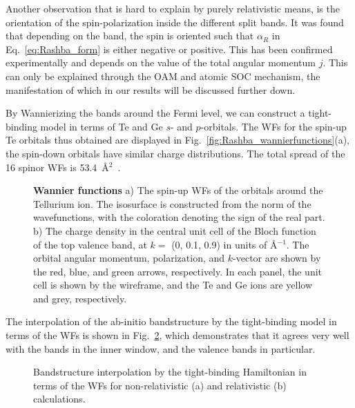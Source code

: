 Another observation that is hard to explain by purely relativistic means, is the orientation of the spin-polarization inside the different split bands.
It was found that depending on the band, the spin is oriented such that $\alpha_R$ in Eq.~\ref{eq:Rashba_form} is either negative or positive. 
This has been confirmed experimentally\cite{Krempasky2015SurfaceSemiconductor} and depends on the value of the total angular momentum $j$.
This can only be explained through the OAM and atomic SOC mechanism, the manifestation of which in our results will be discussed further down.

By Wannierizing the bands around the Fermi level, we can construct a tight-binding model in terms of Te and Ge $s$- and $p$-orbitals.
The WFs for the spin-up Te orbitals thus obtained are displayed in Fig.~\ref{fig:Rashba_wannierfunctions}(a), the spin-down orbitals have similar charge distributions.
The total spread of the 16 spinor WFs is 53.4~\AA$^2$~.
\begin{figure}[h]
\caption{\label{fig:GeTe_wannierization}{\bf Wannier functions} a) The spin-up WFs of the orbitals around the Tellurium ion. The isosurface is constructed from the norm of the wavefunctions, with the coloration denoting the sign of the real part. b) The charge density in the central unit cell of the Bloch function of the top valence band, at $k=$ (0, 0.1, 0.9) in units of \AA$^{-1}$. The orbital angular momentum, polarization, and $k$-vector are shown by the red, blue, and green arrows, respectively. In each panel, the unit cell is shown by the wireframe, and the Te and Ge ions are yellow and grey, respectively.}
\end{figure}

The interpolation of the ab-initio bandstructure by the tight-binding model in terms of the WFs is shown in Fig.~\ref{fig:Rashba_wannierization}, which demonstrates that it agrees very well with the bands in the inner window, and the valence bands in particular. 
\begin{figure}[h]
\caption{\label{fig:Rashba_wannierization} Bandstructure interpolation by the tight-binding Hamiltonian in terms of the WFs for non-relativistic (a) and relativistic (b) calculations.}
\end{figure}

